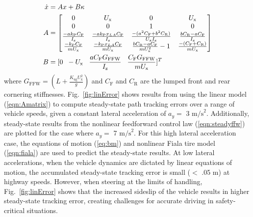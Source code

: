 \documentclass{nVSD2e}
\theoremstyle{plain}
\theoremstyle{definition}
\theoremstyle{remark}
\begin{document}
\begin{subequations}
\label{eqn:Amatrix}
\begin{align}
    \dot{x} &= Ax + B\kappa  \\
	A  &=  \begin{bmatrix}
   0 & U_\mathrm{x} & 0 & U_\mathrm{x} \\ 
   0 & 0 & 1 & 0 \\ 
   \frac{-ak_\mathrm{P} C_\mathrm{F}}{I_\mathrm{z}}  & \frac{-ak_\mathrm{P}x_{LA}C_\mathrm{F}}{I_\mathrm{z}}  & \frac{-(a^2C_\mathrm{F}+b^2C_\mathrm{R})}{U_\mathrm{x}I_\mathrm{z}} & \frac{bC_\mathrm{R} - aC_\mathrm{F}}{I_\mathrm{z}}  \\
   \frac{-k_\mathrm{P}C_\mathrm{F}}{mU_\mathrm{x}}  & \frac{-k_\mathrm{P}x_{LA}C_\mathrm{F}}{mU_\mathrm{x}}  & \frac{bC_\mathrm{R}-aC_\mathrm{F}}{mU_\mathrm{x}^2}-1 & \frac{-(C_\mathrm{F} + C_\mathrm{R})}{mU_\mathrm{x}}
  \end{bmatrix} \\
	B  &=[0 \hspace{2 mm} -U_\mathrm{x} \hspace{3 mm} \frac{a C_\mathrm{F} G_\mathrm{FFW}}{I_\mathrm{z}} \hspace{3 mm}  \frac{C_\mathrm{F} G_\mathrm{FFW}}{mU_\mathrm{x}}]^T
\end{align}
\end{subequations}
where $G_\mathrm{FFW} = (L+\frac{K_\mathrm{ug} U_\mathrm{x}^2}{g})$ and $C_\mathrm{F}$ and $C_\mathrm{R}$ are the lumped front and rear cornering stiffnesses. Fig.~\ref{fig:linError} shows results from using the linear model (\ref{eqn:Amatrix}) to compute steady-state path
 tracking errors over a range of vehicle speeds, given
 a constant lateral acceleration of $a_y =$ 3 $\mathrm{m/s}^2$. Additionally, steady-state results from the nonlinear feedforward control law 
 (\ref{eqn:steadyffw}) are plotted for the case where $a_y =$ 7 $\mathrm{m/s}^2$. For this high lateral acceleration case, the
 equations of motion (\ref{eq:bm}) and nonlinear Fiala tire model (\ref{eqn:fiala}) are used to predict the steady-state results. At low lateral accelerations, when the vehicle
 dynamics are dictated by linear equations of motion, the accumulated steady-state tracking error is small ($<$ .05 m) at highway speeds. However, 
when steering at the limits of handling, Fig.~\ref{fig:linError} shows that the increased sideslip of the vehicle results
 in higher steady-state tracking error, creating challenges for accurate driving in safety-critical situations. 
 
\end{document}
